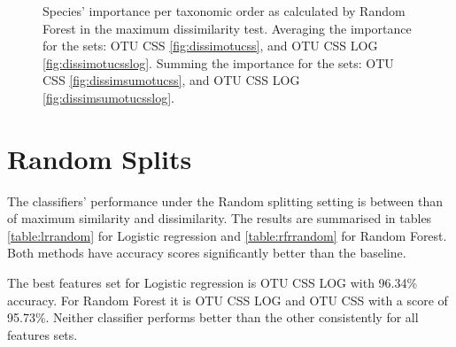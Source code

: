 \begin{figure}[!htb]
	\caption{Species' importance per taxonomic order as calculated by Random Forest in the maximum dissimilarity test. Averaging the importance for the sets: OTU CSS \ref{fig:dissimotucss}, and OTU CSS LOG \ref{fig:dissimotucsslog}. Summing the importance for the sets: OTU CSS \ref{fig:dissimsumotucss}, and OTU CSS LOG \ref{fig:dissimsumotucsslog}.
	 }
	\label{fig:dispie}
\end{figure}

\section{Random Splits}
The classifiers' performance under the Random splitting setting is between than of maximum similarity and dissimilarity. The results are summarised in tables \ref{table:lrrandom} for Logistic regression and \ref{table:rfrrandom} for Random Forest. Both methods have accuracy scores significantly better than the baseline.


The best features set for Logistic regression is OTU CSS LOG with 96.34\% accuracy. For Random Forest it is OTU CSS LOG and OTU CSS with a score of 95.73\%. Neither classifier performs better than the other consistently for all features sets. 


